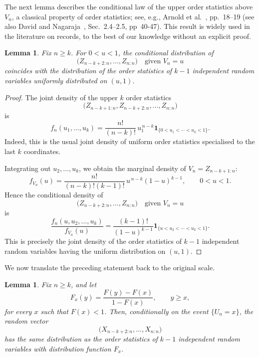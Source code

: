 \documentclass[12pt]{article}
\newtheorem{lemma}[theorem]{Lemma}
\theoremstyle{definition}
\begin{document}
 The next lemma describes the conditional law of the upper order statistics above $V_n$, a classical property of order statistics; see, e.g., Arnold et al.~\cite{ArnoldBalakrishnanNagaraja1998}, pp.~18--19 (see also David and Nagaraja~\cite{DavidNagaraja2003}, Sec.~2.4--2.5, pp~40-47). This result is widely used in the literature on records, to the best of our knowledge without an explicit proof.
 \begin{lemma}
\label{lem:conditional-upper-uniform-order-stats}
Fix $n\ge k$. For $0<u<1$, the conditional distribution of
\[
\bigl(Z_{n-k+2:n},\dots,Z_{n:n}\bigr)
\quad \text{given } V_n=u
\]
coincides with the distribution of the order statistics of $k-1$ independent random variables uniformly distributed on $(u,1)$.
\end{lemma}

\begin{proof}
The joint density of the upper $k$ order statistics
\[
\bigl(Z_{n-k+1:n},Z_{n-k+2:n},\dots,Z_{n:n}\bigr)
\]
is
\[
f_n(u_1,\dots,u_k)
=
\frac{n!}{(n-k)!}\,u_1^{\,n-k}
\mathbf{1}_{\{0<u_1<\cdots<u_k<1\}}.
\]
Indeed, this is the usual joint density of uniform order statistics specialised to the last $k$ coordinates.

Integrating out $u_2,\dots,u_k$, we obtain the marginal density of $V_n=Z_{n-k+1:n}$:
\[
f_{V_n}(u)
=
\frac{n!}{(n-k)!(k-1)!}\,
u^{\,n-k}(1-u)^{k-1},
\qquad 0<u<1.
\]
Hence the conditional density of
\[
\bigl(Z_{n-k+2:n},\dots,Z_{n:n}\bigr)
\quad \text{given } V_n=u
\]
is
\[
\frac{f_n(u,u_2,\dots,u_k)}{f_{V_n}(u)}
=
\frac{(k-1)!}{(1-u)^{k-1}}
\mathbf{1}_{\{u<u_2<\cdots<u_k<1\}}.
\]
This is precisely the joint density of the order statistics of $k-1$ independent random variables having the uniform distribution on $(u,1)$.
\end{proof}

\medskip

We now translate the preceding statement back to the original scale.

\begin{lemma}
\label{lem:conditional-upper-order-stats}
Fix $n\ge k$, and let
\[
F_x(y)=\frac{F(y)-F(x)}{1-F(x)}, \qquad y\ge x,
\]
for every $x$ such that $F(x)<1$. Then, conditionally on the event $\{U_n=x\}$, the random vector
\[
\bigl(X_{n-k+2:n},\dots,X_{n:n}\bigr)
\]
has the same distribution as the order statistics of $k-1$ independent random variables with distribution function $F_x$.
\end{lemma}
\end{document}
